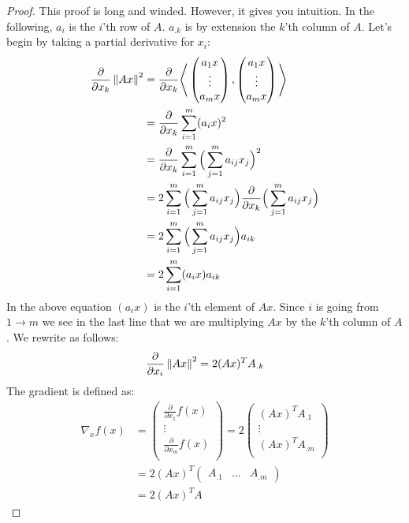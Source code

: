 \begin{proof}
\label{sec:gradient_squared_norm}
This proof is long and winded. However, it gives you intuition.
In the following, $a_i$ is the $i$'th row of $A$. $a_{.k}$
is by extension the $k$'th column of $A$.
Let's begin by taking a partial derivative for $x_i$:
\begin{equation}
\begin{split}
\frac{\partial}{\partial x_k} \left\lVert Ax\right\rVert^2 
&= \frac{\partial}{\partial x_k} \Bigg\langle 
\begin{pmatrix}
a_1x \\
\vdots \\
a_mx
\end{pmatrix},
\begin{pmatrix}
a_1x \\
\vdots \\
a_mx \\
\end{pmatrix} \Bigg\rangle \\
&= \frac{\partial}{\partial x_k}\sum_{i=1}^{m} (a_ix)^2 \\
&= \frac{\partial}{\partial x_k}\sum_{i=1}^{m} \Big(\sum_{j=1}^{m} a_{ij}x_j\Big)^2 \\
&= 2\sum_{i=1}^{m}\Big(\sum_{j=1}^{m} a_{ij}x_j \Big) \frac{\partial}{\partial x_k} 
		\Big(\sum_{j=1}^{m} a_{ij}x_j \Big)\\
&= 2\sum_{i=1}^{m}\Big(\sum_{j=1}^{m} a_{ij}x_j \Big) a_{ik} \\
&= 2\sum_{i=1}^{m}(a_ix)a_{ik}
\end{split}
\end{equation}
In the above equation $(a_ix)$ is the $i$'th element of $Ax$.
Since $i$ is going from $1 \rightarrow m$ we see in the last line
that we are multiplying $Ax$ by the $k$'th column of $A$.
We rewrite as follows:
\begin{equation}
\frac{\partial}{\partial x_i} \left\lVert Ax\right\rVert^2 = 2(Ax)^TA_{.k}
\end{equation}
The gradient is defined as:
\begin{equation}
\begin{split}
\nabla_x f(x)&= 
\begin{pmatrix}
\frac{\partial}{\partial x_1} f(x)\\
\vdots \\
\frac{\partial}{\partial x_m} f(x)\\
\end{pmatrix}
=2
\begin{pmatrix}
(Ax)^TA_{.1}\\
\vdots \\
(Ax)^TA_{.m} \\
\end{pmatrix} \\
&= 2(Ax)^T\begin{pmatrix}
A_{.1} &
\hdots &
A_{.m}
\end{pmatrix} \\
&= 2 (Ax)^T A
\end{split}
\end{equation}
\end{proof}

